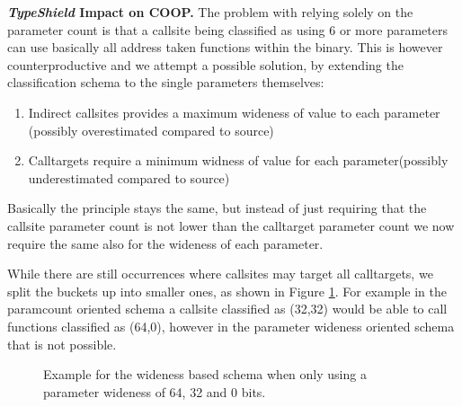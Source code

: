 \textbf{\textit{TypeShield} Impact on COOP.}
\label{TypeShild Impact on COOP}
The problem with relying solely on the parameter count is that a callsite being classified as using 6 or more parameters can use basically all address taken functions within the binary. This is however counterproductive and we attempt a possible solution, by extending the classification schema to the single parameters themselves:

\begin{enumerate}
\item Indirect callsites provides a maximum wideness of value to each parameter (possibly overestimated compared to source)
\item Calltargets require a minimum widness of value for each parameter(possibly underestimated compared to source)
\end{enumerate}

Basically the principle stays the same, but instead of just requiring that the callsite parameter count is not lower than the calltarget parameter count we now require the same also for the wideness of each parameter.

While there are still occurrences where callsites may target all calltargets, we split the buckets up into smaller ones, as shown in Figure \ref{fig:lattice3264}. For example in the paramcount oriented schema a callsite classified as (32,32) would be able to call functions classified as (64,0), however in the parameter wideness oriented schema that is not possible.

\begin{figure}[!h]
\centering
{}
\caption{Example for the wideness based schema when only using a parameter wideness of 64, 32 and 0 bits.}
\label{fig:lattice3264}
\end{figure}